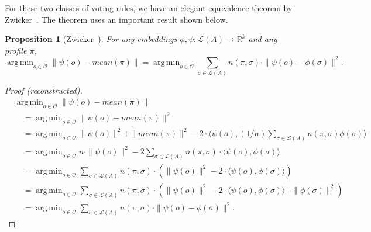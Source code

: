 \documentclass[10pt,letterpaper]{article}
\newcommand{\calL}{{\mathcal{L}}}
\newcommand{\rank}{{\calL(A)}}
\newcommand{\calO}{{\mathcal{O}}}
\DeclareMathOperator*{\argmin}{arg\,min}
\newtheorem{proposition}{Proposition}
\begin{document}


For these two classes of voting rules, we have an elegant equivalence theorem by Zwicker~\cite{Zwicker08a}. The theorem uses an important result shown below.

\begin{proposition}[Zwicker~\cite{Zwicker08a}]
For any embeddings $\phi,\psi : \rank \rightarrow \mathbb{R}^k$ and any profile $\pi$,
$$
\argmin_{o \in \calO} \|\psi(o)-mean(\pi)\| = \argmin_{o \in \calO} \sum_{\sigma \in \rank} n(\pi,\sigma) \cdot \|\psi(o)-\phi(\sigma)\|^2.
$$ 
\label{prop:MPR-GSR-conversion}
\end{proposition}
\begin{proof}[Proof (reconstructed)]
\begin{align*}
&\argmin_{o \in \calO} \|\psi(o)-mean(\pi)\| \\
&\quad= \argmin_{o \in \calO} \|\psi(o)-mean(\pi)\|^2 \\
&\quad= \argmin_{o \in \calO} \|\psi(o)\|^2 + \|mean(\pi)\|^2 - 2 \cdot \langle \psi(o), (1/n) \sum_{\sigma \in \rank} n(\pi,\sigma) \phi(\sigma) \rangle\\
&\quad= \argmin_{o \in \calO} n \cdot \|\psi(o)\|^2 - 2 \sum_{\sigma \in \rank} n(\pi,\sigma) \cdot \langle \psi(o), \phi(\sigma) \rangle\\
&\quad= \argmin_{o \in \calO} \sum_{\sigma \in \rank} n(\pi,\sigma) \cdot (\|\psi(o)\|^2 - 2 \cdot \langle \psi(o), \phi(\sigma) \rangle )\\
&\quad= \argmin_{o \in \calO} \sum_{\sigma \in \rank} n(\pi,\sigma) \cdot (\|\psi(o)\|^2 - 2 \cdot \langle \psi(o), \phi(\sigma) \rangle + \|\phi(\sigma)\|^2)\\
&\quad= \argmin_{o \in \calO} \sum_{\sigma \in \rank} n(\pi,\sigma) \cdot \|\psi(o)-\phi(\sigma)\|^2.
\end{align*}
\end{proof}
\end{document}
